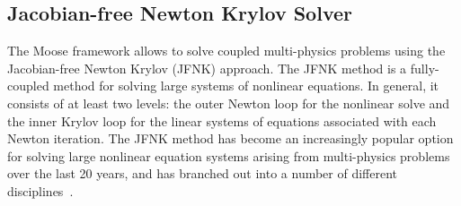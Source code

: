 \subsection{Jacobian-free Newton Krylov Solver\label{sec:jfnk}}
The Moose framework allows to solve coupled multi-physics problems using the
Jacobian-free Newton Krylov (JFNK) approach. 
The JFNK method is a fully-coupled method for solving large systems of
nonlinear equations. In general, it consists of at least two
levels: the outer Newton loop for the nonlinear solve and the inner
Krylov loop for the linear systems of equations associated with each Newton
iteration.  The JFNK method has become an increasingly popular option
for solving large nonlinear equation systems arising from
multi-physics problems over the last 20 years, and has branched out
into a number of different disciplines~\cite{Knoll_2004}.

